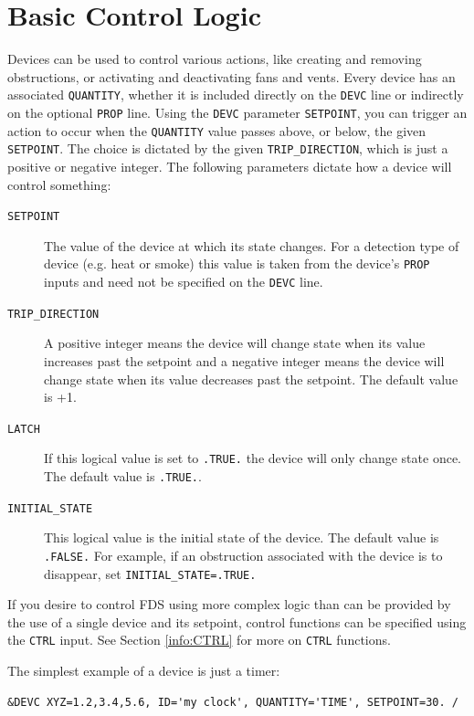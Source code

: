 \documentclass[11pt]{book}
\newcommand{\ct}{\tt\small}
\begin{document}
\clearpage

\section{Basic Control Logic}
\label{info:basic_control}
Devices can be used to control various actions, like creating and removing obstructions, or activating and deactivating
fans and vents. Every device has an associated {\ct QUANTITY}, whether it is included directly on the {\ct DEVC} line or
indirectly on the optional {\ct PROP} line. Using the {\ct DEVC} parameter {\ct SETPOINT}, you can trigger an action to
occur when the {\ct QUANTITY} value passes above, or below, the given {\ct SETPOINT}. The choice is dictated by the
given {\ct TRIP\_DIRECTION}, which is just a positive or negative integer.
The following parameters dictate how a device will control something:
\begin{description}
\item[{\ct SETPOINT}] The value of the device at which its state changes.  For a detection type of device
(e.g. heat or smoke) this value is taken from the device's {\ct PROP} inputs and need not be specified on the {\ct DEVC} line.
\item[{\ct TRIP\_DIRECTION}] A positive integer means the device will change state when its value increases
past the setpoint and a negative integer means the device will change state
when its value decreases past the setpoint.  The default value is +1.
\item[{\ct LATCH}] If this logical value is set to {\ct .TRUE.} the device will only change state once.
The default value is {\ct .TRUE.}.
\item[{\ct INITIAL\_STATE}] This logical value is the initial state of the device. The default value
is {\ct .FALSE.} For example, if an obstruction associated with the device is to disappear, set {\ct INITIAL\_STATE=.TRUE.}
\end{description}
If you desire to control FDS using more complex logic than can be provided
by the use of a single device and its setpoint, control functions can be specified using the {\ct CTRL} input.
See Section \ref{info:CTRL} for more on {\ct CTRL} functions.

The simplest example of a device is just a timer:

\footnotesize
\begin{verbatim}
&DEVC XYZ=1.2,3.4,5.6, ID='my clock', QUANTITY='TIME', SETPOINT=30. /
\end{verbatim}
\normalsize
\end{document}
